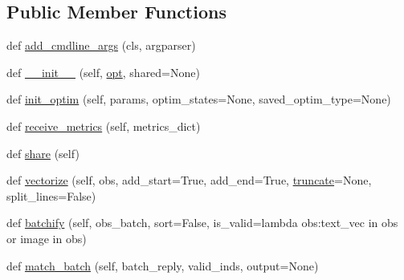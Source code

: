 \subsection*{Public Member Functions}
\begin{DoxyCompactItemize}
\item 
def \hyperlink{classparlai_1_1agents_1_1legacy__agents_1_1seq2seq_1_1torch__agent__v1_1_1TorchAgent_a00701a40d62943dbd887525bf8e8002d}{add\+\_\+cmdline\+\_\+args} (cls, argparser)
\item 
def \hyperlink{classparlai_1_1agents_1_1legacy__agents_1_1seq2seq_1_1torch__agent__v1_1_1TorchAgent_a1c4eb91757ee23e75edfa957d05db338}{\+\_\+\+\_\+init\+\_\+\+\_\+} (self, \hyperlink{classparlai_1_1agents_1_1legacy__agents_1_1seq2seq_1_1torch__agent__v1_1_1TorchAgent_a4e938a91873bd6edde0ac7ed5299bc6a}{opt}, shared=None)
\item 
def \hyperlink{classparlai_1_1agents_1_1legacy__agents_1_1seq2seq_1_1torch__agent__v1_1_1TorchAgent_a1727b17db185dcc7237d893018c7b76c}{init\+\_\+optim} (self, params, optim\+\_\+states=None, saved\+\_\+optim\+\_\+type=None)
\item 
def \hyperlink{classparlai_1_1agents_1_1legacy__agents_1_1seq2seq_1_1torch__agent__v1_1_1TorchAgent_af97699a6b03a17969830db378f09cac4}{receive\+\_\+metrics} (self, metrics\+\_\+dict)
\item 
def \hyperlink{classparlai_1_1agents_1_1legacy__agents_1_1seq2seq_1_1torch__agent__v1_1_1TorchAgent_a3d922c4a8452c9e44fa2478e6fecdfd1}{share} (self)
\item 
def \hyperlink{classparlai_1_1agents_1_1legacy__agents_1_1seq2seq_1_1torch__agent__v1_1_1TorchAgent_a866838e1c81063a3ec18c5609e029f90}{vectorize} (self, obs, add\+\_\+start=True, add\+\_\+end=True, \hyperlink{classparlai_1_1agents_1_1legacy__agents_1_1seq2seq_1_1torch__agent__v1_1_1TorchAgent_ac0286e4dbf6dc71bda0c364851de5f22}{truncate}=None, split\+\_\+lines=False)
\item 
def \hyperlink{classparlai_1_1agents_1_1legacy__agents_1_1seq2seq_1_1torch__agent__v1_1_1TorchAgent_ab8b2fa26aabfd9d7e7abb0abbcfe8044}{batchify} (self, obs\+\_\+batch, sort=False, is\+\_\+valid=lambda obs\+:\textquotesingle{}text\+\_\+vec\textquotesingle{} in obs or \textquotesingle{}image\textquotesingle{} in obs)
\item 
def \hyperlink{classparlai_1_1agents_1_1legacy__agents_1_1seq2seq_1_1torch__agent__v1_1_1TorchAgent_acac419cfad0fc5988e7e796c244f3a9f}{match\+\_\+batch} (self, batch\+\_\+reply, valid\+\_\+inds, output=None)
\item 

\end{DoxyCompactItemize}
